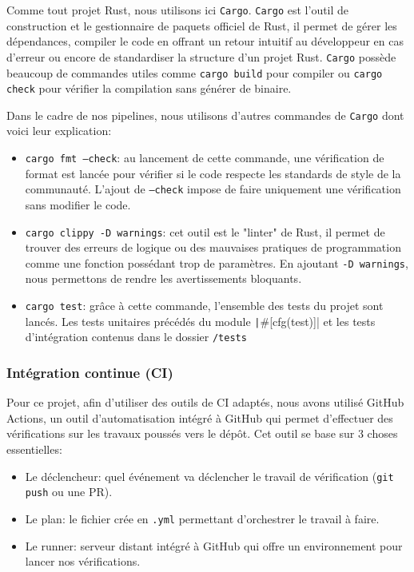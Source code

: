 \documentclass{article}
\begin{document}
Comme tout projet Rust, nous utilisons ici \texttt{Cargo}. \texttt{Cargo} est l'outil de construction et le gestionnaire de paquets officiel de Rust, 
il permet de gérer les dépendances, compiler le code en offrant un retour intuitif au développeur en cas d'erreur ou encore de standardiser la structure d'un projet Rust.
\texttt{Cargo} possède beaucoup de commandes utiles comme \texttt{cargo build} pour compiler ou \texttt{cargo check} pour vérifier la compilation sans générer de binaire.

Dans le cadre de nos pipelines, nous utilisons d'autres commandes de \texttt{Cargo} dont voici leur explication:
\begin{itemize}
    \item \texttt{cargo fmt --check}: au lancement de cette commande, une vérification de format est lancée pour vérifier si le code respecte les standards de style de la communauté.
    L'ajout de \texttt{--check} impose de faire uniquement une vérification sans modifier le code.
    \item \texttt{cargo clippy -D warnings}: cet outil est le "linter" de Rust, il permet de trouver des erreurs de logique ou des mauvaises pratiques de programmation comme une fonction possédant trop de paramètres.
    En ajoutant \texttt{-D warnings}, nous permettons de rendre les avertissements bloquants.
    \item \texttt{cargo test}: grâce à cette commande, l'ensemble des tests du projet sont lancés. Les tests unitaires précédés du module \texttt|#[cfg(test)]| et les tests d'intégration contenus dans le dossier \texttt{/tests}
\end{itemize}
\subsubsection{Intégration continue (CI)}
Pour ce projet, afin d'utiliser des outils de CI adaptés, nous avons utilisé GitHub Actions, un outil d'automatisation intégré à GitHub qui permet d'effectuer des vérifications sur les travaux poussés vers le dépôt.
Cet outil se base sur 3 choses essentielles:
\begin{itemize}
    \item Le déclencheur: quel événement va déclencher le travail de vérification (\texttt{git push} ou une PR).
    \item Le plan: le fichier crée en \texttt{.yml} permettant d'orchestrer le travail à faire.
    \item Le runner: serveur distant intégré à GitHub qui offre un environnement pour lancer nos vérifications.
\end{itemize}
\end{document}
